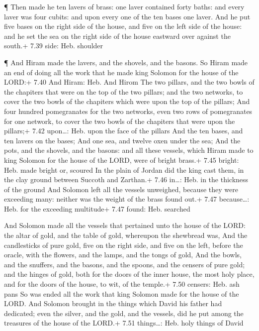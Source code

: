  ¶ Then made he ten lavers of brass: one laver contained
forty baths: and every laver was four cubits: and upon every one of the
ten bases one laver.  And he put five bases on the right
side of the house, and five on the left side of the house: and he set
the sea on the right side of the house eastward over against the south.+
7.39 side: Heb. shoulder

 ¶ And Hiram made the lavers, and the shovels, and the
basons. So Hiram made an end of doing all the work that he made king
Solomon for the house of the LORD:+ 7.40 And Hiram: Heb. And Hirom
 The two pillars, and the two bowls of the chapiters that
were on the top of the two pillars; and the two networks, to cover the
two bowls of the chapiters which were upon the top of the pillars;
 And four hundred pomegranates for the two networks, even
two rows of pomegranates for one network, to cover the two bowls of the
chapiters that were upon the pillars;+ 7.42 upon\ldots: Heb. upon the
face of the pillars  And the ten bases, and ten lavers on
the bases;  And one sea, and twelve oxen under the sea;
 And the pots, and the shovels, and the basons: and all
these vessels, which Hiram made to king Solomon for the house of the
LORD, were of bright brass.+ 7.45 bright: Heb. made bright or, scoured
 In the plain of Jordan did the king cast them, in the clay
ground between Succoth and Zarthan.+ 7.46 in\ldots: Heb. in the
thickness of the ground  And Solomon left all the vessels
unweighed, because they were exceeding many: neither was the weight of
the brass found out.+ 7.47 because\ldots: Heb. for the exceeding
multitude+ 7.47 found: Heb. searched

 And Solomon made all the vessels that pertained unto the
house of the LORD: the altar of gold, and the table of gold, whereupon
the shewbread was,  And the candlesticks of pure gold, five
on the right side, and five on the left, before the oracle, with the
flowers, and the lamps, and the tongs of gold,  And the
bowls, and the snuffers, and the basons, and the spoons, and the censers
of pure gold; and the hinges of gold, both for the doors of the inner
house, the most holy place, and for the doors of the house, to wit, of
the temple.+ 7.50 censers: Heb. ash pans  So was ended all
the work that king Solomon made for the house of the LORD. And Solomon
brought in the things which David his father had dedicated; even the
silver, and the gold, and the vessels, did he put among the treasures of
the house of the LORD.+ 7.51 things\ldots: Heb. holy things of David

